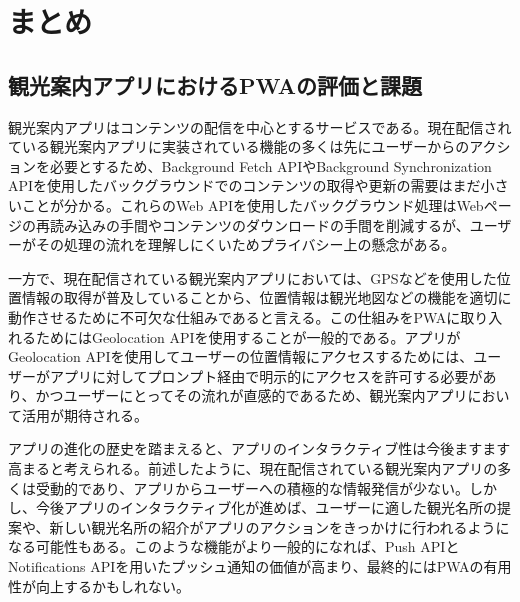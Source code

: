 \section{まとめ}\label{section:まとめ}
\subsection{観光案内アプリにおけるPWAの評価と課題}\label{subsection:観光案内アプリにおけるPWAの評価と課題}
観光案内アプリはコンテンツの配信を中心とするサービスである。現在配信されている観光案内アプリに実装されている機能の多くは先にユーザーからのアクションを必要とするため、Background Fetch APIやBackground Synchronization APIを使用したバックグラウンドでのコンテンツの取得や更新の需要はまだ小さいことが分かる。これらのWeb APIを使用したバックグラウンド処理はWebページの再読み込みの手間やコンテンツのダウンロードの手間を削減するが、ユーザーがその処理の流れを理解しにくいためプライバシー上の懸念がある。

一方で、現在配信されている観光案内アプリにおいては、GPSなどを使用した位置情報の取得が普及していることから、位置情報は観光地図などの機能を適切に動作させるために不可欠な仕組みであると言える。この仕組みをPWAに取り入れるためにはGeolocation APIを使用することが一般的である。アプリがGeolocation APIを使用してユーザーの位置情報にアクセスするためには、ユーザーがアプリに対してプロンプト経由で明示的にアクセスを許可する必要があり、かつユーザーにとってその流れが直感的であるため、観光案内アプリにおいて活用が期待される。

アプリの進化の歴史を踏まえると、アプリのインタラクティブ性は今後ますます高まると考えられる。前述したように、現在配信されている観光案内アプリの多くは受動的であり、アプリからユーザーへの積極的な情報発信が少ない。しかし、今後アプリのインタラクティブ化が進めば、ユーザーに適した観光名所の提案や、新しい観光名所の紹介がアプリのアクションをきっかけに行われるようになる可能性もある。このような機能がより一般的になれば、Push APIとNotifications APIを用いたプッシュ通知の価値が高まり、最終的にはPWAの有用性が向上するかもしれない。

